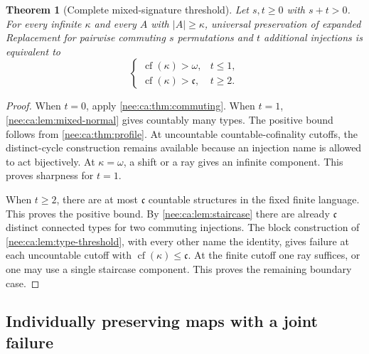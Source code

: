 \documentclass[11pt,letterpaper]{article}
\numberwithin{equation}{section}
\theoremstyle{plain}
\newtheorem{theorem}{Theorem}[section]
\theoremstyle{definition}
\theoremstyle{remark}
\newcommand{\cf}{\operatorname{cf}}
\newcommand{\cont}{\mathfrak c}
\begin{document}
\begin{theorem}[Complete mixed-signature threshold]\label{nee:ca:thm:mixed}
Let $s,t\geq0$ with $s+t>0$. For every infinite $\kappa$ and every $A$ with $|A|\geq\kappa$, universal preservation of expanded Replacement for pairwise commuting $s$ permutations and $t$ additional injections is equivalent to
\begin{equation}\label{nee:ca:eq:mixed-threshold}
\begin{cases}
\cf(\kappa)>\omega,&t\leq1,\\
\cf(\kappa)>\cont,&t\geq2.
\end{cases}
\end{equation}
\end{theorem}
\begin{proof}
When $t=0$, apply \cref{nee:ca:thm:commuting}. When $t=1$, \cref{nee:ca:lem:mixed-normal} gives countably many types. The positive bound follows from \cref{nee:ca:thm:profile}. At uncountable countable-cofinality cutoffs, the distinct-cycle construction remains available because an injection name is allowed to act bijectively. At $\kappa=\omega$, a shift or a ray gives an infinite component. This proves sharpness for $t=1$.

When $t\geq2$, there are at most $\cont$ countable structures in the fixed finite language. This proves the positive bound. By \cref{nee:ca:lem:staircase} there are already $\cont$ distinct connected types for two commuting injections. The block construction of \cref{nee:ca:lem:type-threshold}, with every other name the identity, gives failure at each uncountable cutoff with $\cf(\kappa)\leq\cont$. At the finite cutoff one ray suffices, or one may use a single staircase component. This proves the remaining boundary case.
\end{proof}

\subsection{Individually preserving maps with a joint failure}
\end{document}
